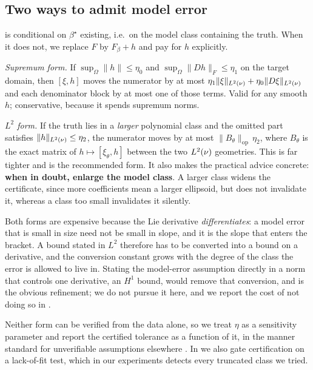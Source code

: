 \subsection{Two ways to admit model error}
\label{sec:modelerror}

 is conditional on $\beta^\star$ existing, i.e.\ on
the model class containing the truth. When it does not, we replace $F$ by
$F_\beta + h$ and pay for $h$ explicitly.

\emph{Supremum form.} If $\sup_\Omega \|h\| \le \eta_0$ and
$\sup_\Omega\|Dh\|_F \le \eta_1$ on the target domain, then $[\xi,h]$ moves
the numerator by at most $\eta_1\|\xi\|_{L^2(\nu)} +
\eta_0\|D\xi\|_{L^2(\nu)}$ and each denominator block by at most one of
those terms. Valid for any smooth $h$; conservative, because it spends
supremum norms.

\emph{$L^2$ form.} If the truth lies in a \emph{larger} polynomial class and
the omitted part satisfies $\|h\|_{L^2(\nu)} \le \eta_2$, the numerator
moves by at most $\|B_\theta\|_{\mathrm{op}}\,\eta_2$, where $B_\theta$ is the
exact matrix of $h \mapsto [\xi_\theta, h]$ between the two $L^2(\nu)$
geometries. This is far tighter and is the recommended form. It also makes the
practical advice concrete: \textbf{when in doubt, enlarge the model class}. A
larger class widens the certificate, since more coefficients mean a larger
ellipsoid, but does not invalidate it, whereas a class too small invalidates
it silently.

Both forms are expensive because the Lie derivative \emph{differentiates}: a
model error that is small in size need not be small in slope, and it is the
slope that enters the bracket. A bound stated in $L^2$ therefore has to be
converted into a bound on a derivative, and the conversion constant grows with
the degree of the class the error is allowed to live in. Stating the
model-error assumption directly in a norm that controls one derivative, an
$H^1$ bound, would remove that conversion, and is the obvious refinement; we
do not pursue it here, and we report the cost of not doing so in
.

Neither form can be verified from the data alone, so we treat $\eta$ as a
sensitivity parameter and report the certified tolerance as a function of it,
in the manner standard for unverifiable assumptions elsewhere
\citep{rosenbaum2002observational}. In  we also gate
certification on a lack-of-fit test, which in our experiments detects every
truncated class we tried.

